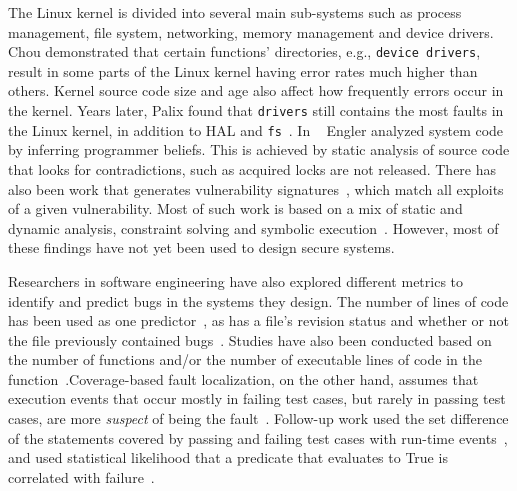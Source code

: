 The Linux kernel is divided into several main sub-systems such as %
process management, file system, networking, memory management and device drivers.
Chou %
\cite{PittSFIeld} demonstrated that certain functions' directories, e.g.,
\texttt{device drivers}, result in some parts of the Linux kernel having
error rates much higher than others. Kernel source code size
and age also affect how frequently errors occur in the kernel.
Years later, Palix found that \texttt{drivers} still contains the most faults in
the Linux kernel, in addition to HAL and \texttt{fs}~\cite{palix2011faults}.
In ~\cite{engler2001bugs} Engler analyzed system code by inferring programmer
beliefs. This is achieved by static analysis
of source code that looks for contradictions, such as acquired locks are
not released. There has also been work that generates vulnerability
signatures~\cite{brumley2006towards}, which match all exploits
of a given vulnerability. Most of such work is based on a mix of static and
dynamic analysis, constraint solving and symbolic execution~\cite{chou2003static}.
However, most of these findings have not yet been used to design
secure systems.

Researchers in software engineering have also %
explored different metrics to identify and predict bugs in the systems they design.
The number of lines of code has been used as one
predictor~\cite{Bug-Location}, as has a file's revision status and
whether or not the file previously contained bugs~\cite{Bug-Location,
lewis2013does}. Studies have also been conducted based on
the number of functions and/or the number of executable lines of code in
the function~\cite{Mining-Metrics}.
Coverage-based fault localization,
on the other hand, assumes that execution events that occur mostly in failing
test cases, but rarely in passing test cases, are more \textit{suspect}
of being the fault~\cite{jones2002visualization}. Follow-up work used
the set difference of the statements covered by passing and failing test
cases with run-time events~\cite{agrawal1995fault, jones2005empirical},
and used statistical likelihood that a predicate that evaluates to True is
correlated with failure~\cite{liblit2005scalable}.

